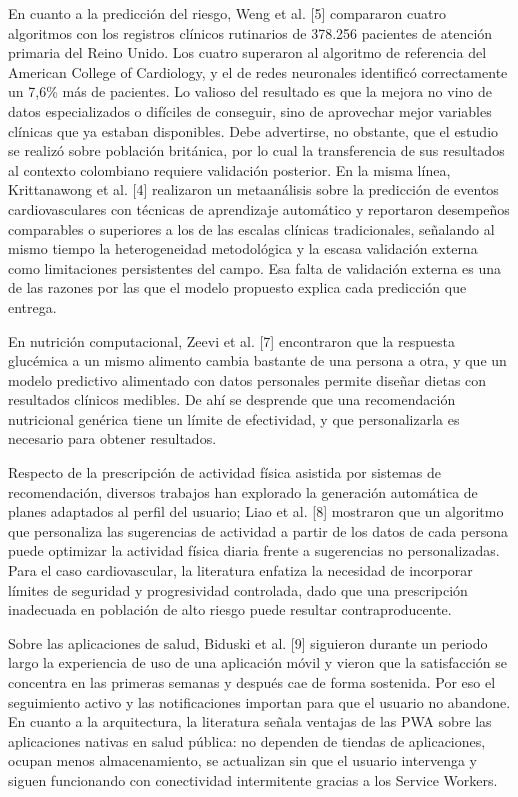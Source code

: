 \documentclass[conference]{IEEEtran}
\begin{document}
En cuanto a la predicción del riesgo, Weng et al. [5] compararon cuatro algoritmos con los registros clínicos rutinarios de 378.256 pacientes de atención primaria del Reino Unido. Los cuatro superaron al algoritmo de referencia del American College of Cardiology, y el de redes neuronales identificó correctamente un 7{,}6\% más de pacientes. Lo valioso del resultado es que la mejora no vino de datos especializados o difíciles de conseguir, sino de aprovechar mejor variables clínicas que ya estaban disponibles. Debe advertirse, no obstante, que el estudio se realizó sobre población británica, por lo cual la transferencia de sus resultados al contexto colombiano requiere validación posterior. En la misma línea, Krittanawong et al. [4] realizaron un metaanálisis sobre la predicción de eventos cardiovasculares con técnicas de aprendizaje automático y reportaron desempeños comparables o superiores a los de las escalas clínicas tradicionales, señalando al mismo tiempo la heterogeneidad metodológica y la escasa validación externa como limitaciones persistentes del campo. Esa falta de validación externa es una de las razones por las que el modelo propuesto explica cada predicción que entrega.

En nutrición computacional, Zeevi et al. [7] encontraron que la respuesta glucémica a un mismo alimento cambia bastante de una persona a otra, y que un modelo predictivo alimentado con datos personales permite diseñar dietas con resultados clínicos medibles. De ahí se desprende que una recomendación nutricional genérica tiene un límite de efectividad, y que personalizarla es necesario para obtener resultados.

Respecto de la prescripción de actividad física asistida por sistemas de recomendación, diversos trabajos han explorado la generación automática de planes adaptados al perfil del usuario; Liao et al. [8] mostraron que un algoritmo que personaliza las sugerencias de actividad a partir de los datos de cada persona puede optimizar la actividad física diaria frente a sugerencias no personalizadas. Para el caso cardiovascular, la literatura enfatiza la necesidad de incorporar límites de seguridad y progresividad controlada, dado que una prescripción inadecuada en población de alto riesgo puede resultar contraproducente.

Sobre las aplicaciones de salud, Biduski et al. [9] siguieron durante un periodo largo la experiencia de uso de una aplicación móvil y vieron que la satisfacción se concentra en las primeras semanas y después cae de forma sostenida. Por eso el seguimiento activo y las notificaciones importan para que el usuario no abandone. En cuanto a la arquitectura, la literatura señala ventajas de las PWA sobre las aplicaciones nativas en salud pública: no dependen de tiendas de aplicaciones, ocupan menos almacenamiento, se actualizan sin que el usuario intervenga y siguen funcionando con conectividad intermitente gracias a los Service Workers.
\end{document}
